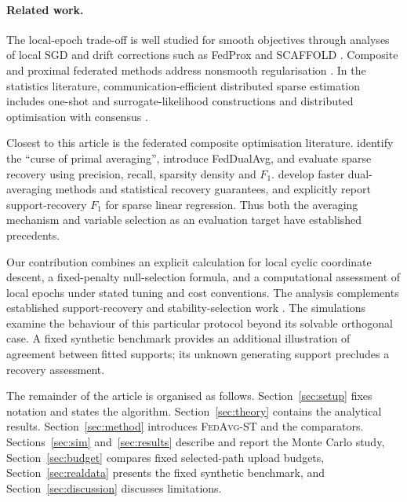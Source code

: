 \paragraph{Related work.} The local-epoch trade-off is well studied for
smooth objectives through analyses of local SGD
\citep{stich2019,li2020convergence} and drift corrections such as FedProx
\citep{li2020fedprox} and SCAFFOLD \citep{karimireddy2020}.
Composite and proximal federated methods address nonsmooth regularisation
\citep{tran2021}. In the statistics literature, communication-efficient
distributed sparse estimation includes one-shot and surrogate-likelihood
constructions \citep{lee2017,battey2018,jordan2019} and distributed
optimisation with consensus \citep{boyd2011,duchi2012,wang2017}.

Closest to this article is the federated composite optimisation
literature. \citet{yuan2021fco} identify the ``curse of primal averaging'',
introduce FedDualAvg, and evaluate sparse recovery using precision,
recall, sparsity density and $F_1$. \citet{bao2022} develop faster
dual-averaging methods and statistical recovery guarantees, and explicitly
report support-recovery $F_1$ for sparse linear regression. Thus both the
averaging mechanism and variable selection as an evaluation target have
established precedents.

Our contribution combines an explicit calculation for local cyclic
coordinate descent, a fixed-penalty null-selection formula, and a
computational assessment of local epochs under stated tuning and cost
conventions. The analysis complements established support-recovery and
stability-selection work \citep{zhaoyu2006,meinshausen2010}. The simulations examine
the behaviour of this particular protocol beyond its solvable orthogonal
case. A fixed synthetic benchmark provides an additional illustration of
agreement between fitted supports; its unknown generating support
precludes a recovery assessment.

The remainder of the article is organised as follows.
Section~\ref{sec:setup} fixes notation and states the algorithm.
Section~\ref{sec:theory} contains the analytical results.
Section~\ref{sec:method} introduces \textsc{FedAvg-ST} and the comparators.
Sections~\ref{sec:sim} and~\ref{sec:results} describe and report the Monte
Carlo study, Section~\ref{sec:budget} compares fixed selected-path upload
budgets, Section~\ref{sec:realdata} presents the fixed synthetic benchmark, and
Section~\ref{sec:discussion} discusses limitations.
